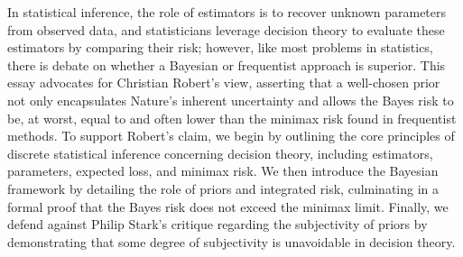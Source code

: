 \documentclass[letterpaper,12pt]{article}
\begin{document}
	\doublespacing

In statistical inference, the role of estimators is to recover unknown parameters from observed data, and statisticians leverage decision theory to evaluate these estimators by comparing their risk; however, like most problems in statistics, there is debate on whether a Bayesian or frequentist approach is superior. This essay advocates for Christian Robert's view, asserting that a well-chosen prior not only encapsulates Nature's inherent uncertainty and allows the Bayes risk to be, at worst, equal to and often lower than the minimax risk found in frequentist methods. To support Robert's claim, we begin by outlining the core principles of discrete statistical inference concerning decision theory, including estimators, parameters, expected loss, and minimax risk. We then introduce the Bayesian framework by detailing the role of priors and integrated risk, culminating in a formal proof that the Bayes risk does not exceed the minimax limit. Finally, we defend against Philip Stark's critique regarding the subjectivity of priors by demonstrating that some degree of subjectivity is unavoidable in decision theory. 
\end{document}
